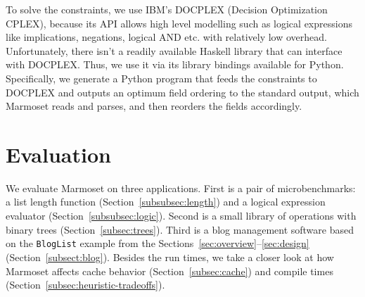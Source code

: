 \documentclass[acmsmall,review,anonymous]{acmart}\settopmatter{printfolios=true,printccs=false,printacmref=false}
\newcommand{\system}{{\sc Marmoset}\xspace}
\begin{document}
To solve the constraints, we use IBM's DOCPLEX (Decision Optimization CPLEX),
because its API allows high level modelling such as logical expressions like implications, negations, logical AND etc. with relatively low overhead. 
Unfortunately, there isn't a readily available Haskell library that can interface with DOCPLEX.
Thus, we use it via its library bindings available for Python.
Specifically, we generate a Python program that feeds the constraints to DOCPLEX and
outputs an optimum field ordering to the standard output,
which \system{} reads and parses, and then reorders the fields accordingly.




















































 \section{Evaluation}

We evaluate \system on three applications.
First is a pair of microbenchmarks: a list length function
(Section~\ref{subsubsec:length}) and a logical expression evaluator (Section~\ref{subsubsec:logic}).
Second is a small library of operations with binary trees (Section~\ref{subsec:trees}).
Third is a blog management software based on the \lstinline|BlogList| example from the
Sections~\ref{sec:overview}--\ref{sec:design} (Section~\ref{subsect:blog}).
Besides the run times, we take a closer look at how \system affects
cache behavior (Section~\ref{subsec:cache}) and compile times (Section~\ref{subsec:heuristic-tradeoffs}). 
\end{document}
